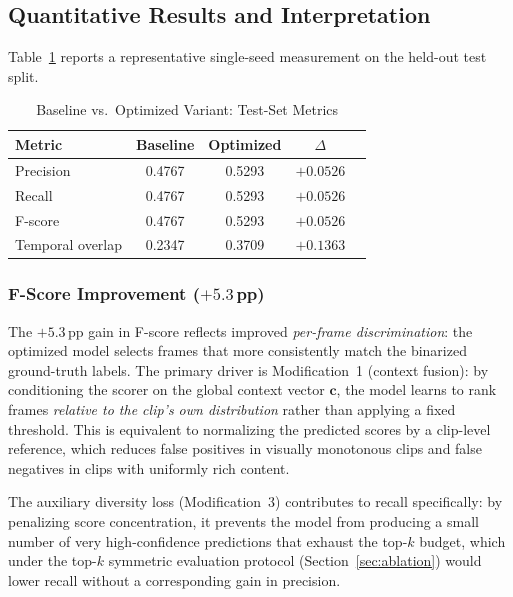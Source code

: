 \documentclass[10pt,conference]{IEEEtran}
\begin{document}
\subsection{Quantitative Results and Interpretation}

Table~\ref{tab:optimize_results} reports a representative single-seed
measurement on the held-out test split.

\begin{table}[H]
\centering
\caption{Baseline vs.\ Optimized Variant: Test-Set Metrics}
\label{tab:optimize_results}
\begin{tabular}{lcccc}
\toprule
\textbf{Metric} & \textbf{Baseline} & \textbf{Optimized} & \textbf{$\Delta$} \\
\midrule
Precision         & 0.4767 & 0.5293 & $+0.0526$ \\
Recall            & 0.4767 & 0.5293 & $+0.0526$ \\
F-score           & 0.4767 & 0.5293 & $+0.0526$ \\
Temporal overlap  & 0.2347 & 0.3709 & $+0.1363$ \\
\bottomrule
\end{tabular}
\end{table}

\subsubsection{F-Score Improvement ($+5.3$\,pp)}

The $+5.3$\,pp gain in F-score reflects improved \emph{per-frame discrimination}:
the optimized model selects frames that more consistently match the binarized
ground-truth labels. The primary driver is Modification~1 (context fusion):
by conditioning the scorer on the global context vector $\mathbf{c}$, the
model learns to rank frames \emph{relative to the clip's own distribution}
rather than applying a fixed threshold. This is equivalent to normalizing the
predicted scores by a clip-level reference, which reduces false positives in
visually monotonous clips and false negatives in clips with uniformly rich
content.

The auxiliary diversity loss (Modification~3) contributes to recall
specifically: by penalizing score concentration, it prevents the model from
producing a small number of very high-confidence predictions that exhaust the
top-$k$ budget, which under the top-$k$ symmetric evaluation protocol
(Section~\ref{sec:ablation}) would lower recall without a corresponding gain
in precision.
\end{document}
